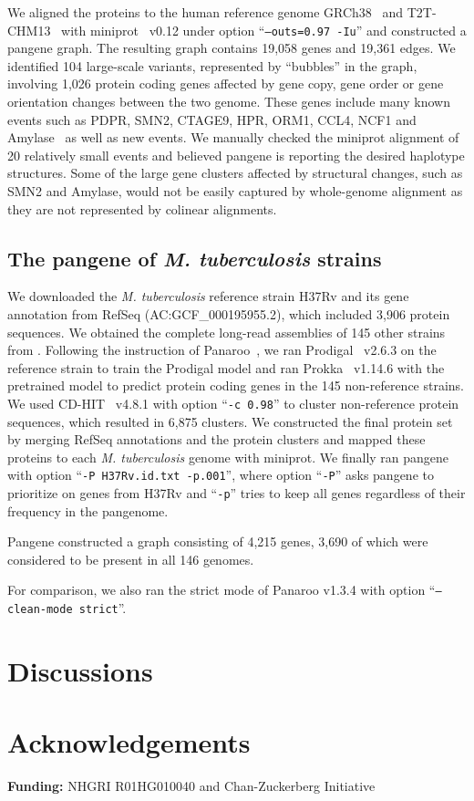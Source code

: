 \documentclass{bioinfo}
\begin{document}
We aligned the proteins to the human reference genome GRCh38~\citep{Schneider:2017aa} and T2T-CHM13~\citep{Nurk:2022up}
with miniprot~\citep{Li:2023ac} v0.12 under option ``{\tt --outs=0.97 -Iu}''
and constructed a pangene graph.
The resulting graph contains 19,058 genes and 19,361 edges.
We identified 104 large-scale variants, represented by ``bubbles'' in the graph,
involving 1,026 protein coding genes affected by gene copy, gene order or gene orientation changes between the two genome.
These genes include many known events such as PDPR, SMN2, CTAGE9, HPR, ORM1, CCL4, NCF1 and Amylase~\citep{Handsaker:2015ur,Sudmant:2010aa}
as well as new events.
We manually checked the miniprot alignment of 20 relatively small events
and believed pangene is reporting the desired haplotype structures.
Some of the large gene clusters affected by structural changes, such as SMN2 and Amylase,
would not be easily captured by whole-genome alignment as they are not represented by colinear alignments.

\subsection*{The pangene of \emph{M. tuberculosis} strains}

We downloaded the \emph{M. tuberculosis} reference strain H37Rv and its gene annotation from RefSeq (AC:GCF\_000195955.2),
which included 3,906 protein sequences.
We obtained the complete long-read assemblies of 145 other strains from \citet{Marin:2022aa}.
Following the instruction of Panaroo~\citep{Tonkin-Hill:2020aa},
we ran Prodigal~\citep{Hyatt:2010aa} v2.6.3 on the reference strain to train the Prodigal model
and ran Prokka~\citep{Seemann:2014aa} v1.14.6 with the pretrained model to predict protein coding genes
in the 145 non-reference strains.
We used CD-HIT~\citep{Li:2006aa,Fu:2012aa} v4.8.1 with option ``{\tt -c 0.98}'' to cluster non-reference protein sequences,
which resulted in 6,875 clusters.
We constructed the final protein set by merging RefSeq annotations and the protein clusters
and mapped these proteins to each \emph{M. tuberculosis} genome with miniprot.
We finally ran pangene with option ``{\tt -P H37Rv.id.txt -p.001}'',
where option ``{\tt -P}'' asks pangene to prioritize on genes from H37Rv and
``{\tt -p}'' tries to keep all genes regardless of their frequency in the pangenome.

Pangene constructed a graph consisting of 4,215 genes,
3,690 of which were considered to be present in all 146 genomes.


For comparison, we also ran the strict mode of Panaroo v1.3.4 with option ``{\tt --clean-mode strict}''.


\section*{Discussions}

\section*{Acknowledgements}

{\bf Funding:} NHGRI R01HG010040 and Chan-Zuckerberg Initiative


\end{document}
